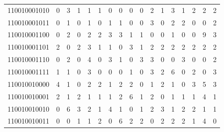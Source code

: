 \documentclass[10pt,a4paper]{article}
\begin{document}
\begin{longtable}{ |c|c|c|c|c|c|c|c|c|c|c|c|c|c|c|c|c| }
    110010001010              & 0                            & 3                                & 1                            & 1                              & 1   & 0   & 0   & 0   & 0   & 2   & 1   & 3   & 1   & 2   & 2   & 2   \\
    110010001011              & 0                            & 1                                & 0                            & 1                              & 0   & 1   & 1   & 0   & 0   & 3   & 0   & 2   & 2   & 0   & 0   & 2   \\
    110010001100              & 0                            & 2                                & 0                            & 2                              & 2   & 3   & 3   & 1   & 1   & 0   & 0   & 1   & 0   & 0   & 9   & 3   \\
    110010001101              & 2                            & 0                                & 2                            & 3                              & 1   & 1   & 0   & 3   & 1   & 2   & 2   & 2   & 2   & 2   & 2   & 2   \\
    110010001110              & 0                            & 2                                & 0                            & 4                              & 0   & 3   & 1   & 0   & 3   & 3   & 0   & 0   & 3   & 0   & 0   & 2   \\
    110010001111              & 1                            & 1                                & 0                            & 3                              & 0   & 0   & 0   & 1   & 0   & 3   & 2   & 6   & 0   & 2   & 0   & 3   \\
    110010010000              & 4                            & 1                                & 0                            & 2                              & 2   & 1   & 2   & 2   & 0   & 1   & 2   & 1   & 0   & 3   & 5   & 3   \\
    110010010001              & 2                            & 1                                & 2                            & 1                              & 1   & 1   & 2   & 6   & 1   & 2   & 0   & 1   & 1   & 1   & 4   & 1   \\
    110010010010              & 0                            & 6                                & 3                            & 2                              & 1   & 4   & 1   & 0   & 1   & 2   & 3   & 1   & 2   & 2   & 1   & 1   \\
    110010010011              & 0                            & 0                                & 1                            & 1                              & 2   & 0   & 6   & 2   & 2   & 0   & 2   & 2   & 2   & 1   & 4   & 0   \\

\end{longtable}
\end{document}
